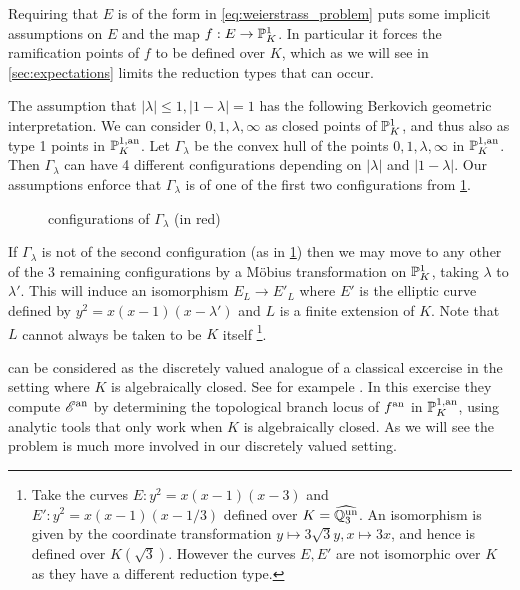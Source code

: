 Requiring that $E$ is of the form in \eqref{eq:weierstrass_problem} puts some implicit assumptions on $E$ and the map $f: E \to \mathbb{P}^{1}_K$.
In particular it forces the ramification points of $f$ to be defined over $K$, which as we will see in \cref{sec:expectations} limits the reduction types that can occur. 

The assumption that $|\lambda| \le 1, |1 - \lambda| = 1$ has the following Berkovich geometric interpretation.
We can consider $0, 1, \lambda, \infty$ as closed points of $\mathbb{P}^{1}_K$, and thus also as type 1 points in $\mathbb{P}^{1, \text{an}}_K$.
Let  $\Gamma_\lambda$ be the convex hull of the points $0, 1, \lambda, \infty$ in $\mathbb{P}^{1, \text{an}}_K$. 
Then  $\Gamma_\lambda$ can have 4 different configurations depending on $|\lambda|$ and $|1-\lambda|$. 
Our assumptions enforce that $\Gamma_\lambda$ is of one of the first two configurations from \cref{fig:configurations_of_gamma_lambda}.
\begin{figure}[ht]
    \centering
    \caption{configurations of $\Gamma_\lambda$ (in red)}
    \label{fig:configurations_of_gamma_lambda}
\end{figure}
If  $\Gamma_\lambda$ is not of the second configuration (as in \cref{fig:configurations_of_gamma_lambda}) then we may move to any other of the 3 remaining configurations by a Möbius transformation on $\mathbb{P}^{1}_K$, taking $\lambda$ to $\lambda'$. 
This will induce an isomorphism $E_L \to E'_L$ where $E'$ is the elliptic curve defined by $y^2 = x(x-1)(x-\lambda')$ and $L$ is a finite extension of $K$. 
Note  that $L$ cannot always be taken to be $K$ itself
\footnote{Take the curves $E: y^2 = x(x -1)(x-3)$ and $E': y^2 = x(x-1)(x-1 /3)$ defined over $K = \widehat{\mathbb{Q}_3^{\text{un}}}$.
An isomorphism is given by the coordinate transformation $y\mapsto 3\sqrt{3} y, x\mapsto 3x$, and hence is defined over $K(\sqrt{3} )$. However the curves $E, E'$ are not isomorphic over $K$ as they have a different reduction type.}.

\begin{remark}
	 can be considered as the discretely valued analogue of a classical excercise in the setting where $K$ is algebraically closed.
	See for exampele \cite[exericise 6.1.3.3]{temkinIntroductionBerkovichAnalytic2010}.  
	In this exercise they compute $\mathscr E{}^{\text{an}}$ by determining the topological branch locus of $f{}^{\text{an}}$ in $\mathbb{P}^{1, \text{an}}_K$, using analytic tools that only work when $K$ is algebraically closed. 
	As we will see the problem is much more involved in our discretely valued setting. 
\end{remark}











